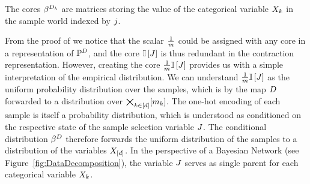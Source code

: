 The cores $\beta^{D_{k}}$ are matrices storing the value of the categorical variable $X_{k}$ in the sample world indexed by $j$.

From the proof of  we notice that the scalar $\frac{1}{m}$ could be assigned with any core in a representation of $\mathbb{P}^{D}$, and the core $\mathbb{I}\left[J\right]$ is thus redundant in the contraction representation.
However, creating the core $\frac{1}{m}\mathbb{I}\left[J\right]$ provides us with a simple interpretation of the empirical distribution.
We can understand $\frac{1}{m}\mathbb{I}\left[J\right]$ as the uniform probability distribution over the samples, which is by the map $D$ forwarded to a distribution over $\bigtimes_{k\in[d]}[m_{k}]$.
The one-hot encoding of each sample is itself a probability distribution, which is understood as conditioned on the respective state of the sample selection variable $J$.
The conditional distribution $\beta^{D}$ therefore forwards the uniform distribution of the samples to a distribution of the variables $X_{[d]}$.
In the perspective of a Bayesian Network (see Figure~\ref{fig:DataDecomposition}), the variable $J$ serves as single parent for each categorical variable $X_{k}$.





